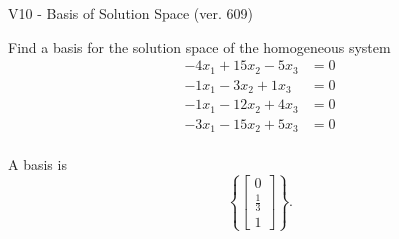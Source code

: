 \begin{exercise}
  \begin{exerciseTitle}V10 - Basis of Solution Space (ver. 609)\end{exerciseTitle}
  \begin{exerciseStatement}
    Find a basis for the solution space of the homogeneous system 
\begin{align*}
 -4 x_ 1 + 15 x_ 2 -5 x_ 3 &= 0  \\ 
  -1 x_ 1 -3 x_ 2 + 1 x_ 3 &= 0  \\ 
  -1 x_ 1 -12 x_ 2 + 4 x_ 3 &= 0  \\ 
  -3 x_ 1 -15 x_ 2 + 5 x_ 3 &= 0  \\ 
 \end{align*}


 
  \end{exerciseStatement}

  \begin{exerciseAnswer}
   A basis is   
\[\left\{\left[\begin{array}{c}
0 \\
\frac{1}{3} \\
1
\end{array}\right]\right\}.\]

  


  \end{exerciseAnswer}
\end{exercise}